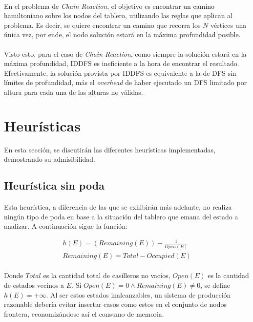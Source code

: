 \documentclass[12pt, twocolumn]{article}
\begin{document}
	\paragraph{} En el problema de \textit{Chain Reaction}, el objetivo es encontrar un camino hamiltoniano sobre los nodos del tablero, utilizando las reglas que aplican al problema. Es decir, se quiere encontrar un camino que recorra los $N$ vértices una única vez, por ende, el nodo solución estará en la máxima profundidad posible.
	
	\paragraph{} Visto esto, para el caso de \textit{Chain Reaction}, como siempre la solución estará en la máxima profundidad, IDDFS es ineficiente a la hora de encontrar el resultado. Efectivamente, la solución provista por IDDFS es equivalente a la de DFS sin límites de profundidad, más el \textit{overhead} de haber ejecutado un DFS limitado por altura para cada una de las alturas no válidas.
	
	\section{Heurísticas}
	
	\paragraph{} En esta sección, se discutirán las diferentes heurísticas implementadas, demostrando su admisibilidad.
	
	\subsection{Heurística sin poda}
	
	\paragraph{} Esta heurística, a diferencia de las que se exhibirán más adelante, no realiza ningún tipo de poda en base a la situación del tablero que emana del estado a analizar. A continuación sigue la función:
	
	\begin{align}
		h(E) = (Remaining(E))-\frac{1}{Open(E)} \\
		Remaining(E) = Total-Occupied(E)
	\end{align}
	
	\paragraph{} Donde $Total$ es la cantidad total de casilleros no vacíos, $Open(E)$ es la cantidad de estados vecinos a $E$. Si $Open(E) = 0 \wedge Remaining(E) \neq 0$, se define $h(E) = +\infty$. Al ser estos estados inalcanzables, un sistema de producción razonable debería evitar insertar casos como estos en el conjunto de nodos frontera, economizándose así el consumo de memoria.
    
\end{document}
